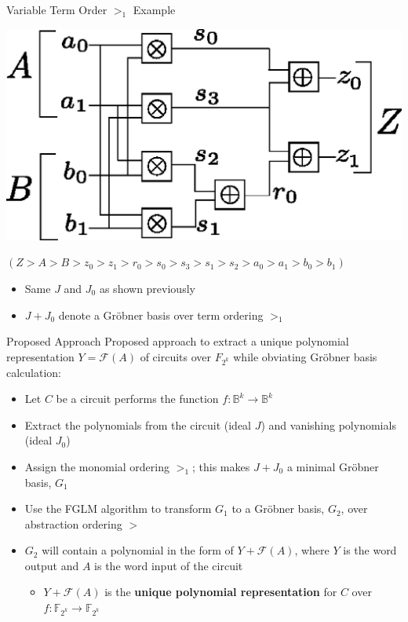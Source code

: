\documentclass[xcolor=dvipsnames]{beamer}
\newcommand{\Fkk}{{\mathbb{F}}_{2^k}}
\newcommand{\Grobner}{Gr\"{o}bner\xspace}
\newcommand{\F}{{\mathcal{F}}}
\newcommand{\B}{{\mathbb{B}}}
\begin{document}

\begin{frame}{\large{Variable Term Order $>_1$ Example}}

\centerline{
\includegraphics[scale=0.4]{2bitmult.eps}
}

{\bf $(Z > A > B > z_0 > z_1 > r_0 > s_0 > s_3 > s_1 > s_2 > a_0 > a_1 > b_0 > b_1)$}

\vspace{0.3in}
\begin{itemize}
\item Same $J$ and $J_0$ as shown previously
\item $J+J_0$ denote a \Grobner basis over term ordering $>_1$
\end{itemize}
\end{frame}


\begin{frame}{\large {Proposed Approach}}
Proposed approach to extract a unique polynomial representation $Y = \F(A)$ of circuits over $F_{2^k}$
while obviating \Grobner basis calculation:
\begin{itemize}
\item Let $C$ be a circuit performs the function $f:
\B^k \rightarrow \B^k$
\item Extract the polynomials from
the circuit (ideal $J$) and vanishing polynomials (ideal $J_0$)
\item Assign the monomial ordering $>_1$; this makes $J+J_0$ a 
minimal Gr\"obner basis, $G_1$
\item Use the FGLM algorithm to transform
$G_1$ to a \Grobner basis, $G_2$, over abstraction ordering $>$
\item $G_2$ will contain a polynomial in the form of $Y + \F(A)$, 
where $Y$ is the word output and $A$ is the word input of the circuit
	\begin{itemize}	
	\item $Y + \F(A)$ is the {\bf unique polynomial representation} for $C$ over $f: \Fkk \rightarrow \Fkk$
	\end{itemize}
\end{itemize}
\end{frame}
\end{document}
